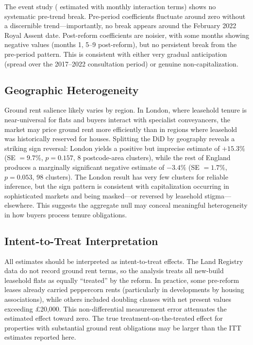 \documentclass[12pt]{article}
\begin{document}


The event study ( estimated with monthly interaction terms) shows no systematic pre-trend break. Pre-period coefficients fluctuate around zero without a discernible trend---importantly, no break appears around the February 2022 Royal Assent date. Post-reform coefficients are noisier, with some months showing negative values (months 1, 5--9 post-reform), but no persistent break from the pre-period pattern. This is consistent with either very gradual anticipation (spread over the 2017--2022 consultation period) or genuine non-capitalization.

\subsection{Geographic Heterogeneity}

Ground rent salience likely varies by region. In London, where leasehold tenure is near-universal for flats and buyers interact with specialist conveyancers, the market may price ground rent more efficiently than in regions where leasehold was historically reserved for houses. Splitting the DiD by geography reveals a striking sign reversal: London yields a positive but imprecise estimate of $+15.3\%$ (SE $= 9.7\%$, $p = 0.157$, 8 postcode-area clusters), while the rest of England produces a marginally significant negative estimate of $-3.4\%$ (SE $= 1.7\%$, $p = 0.053$, 98 clusters). The London result has very few clusters for reliable inference, but the sign pattern is consistent with capitalization occurring in sophisticated markets and being masked---or reversed by leasehold stigma---elsewhere. This suggests the aggregate null may conceal meaningful heterogeneity in how buyers process tenure obligations.

\subsection{Intent-to-Treat Interpretation}

All estimates should be interpreted as intent-to-treat effects. The Land Registry data do not record ground rent terms, so the analysis treats all new-build leasehold flats as equally ``treated'' by the reform. In practice, some pre-reform leases already carried peppercorn rents (particularly in developments by housing associations), while others included doubling clauses with net present values exceeding \pounds 20,000. This non-differential measurement error attenuates the estimated effect toward zero. The true treatment-on-the-treated effect for properties with substantial ground rent obligations may be larger than the ITT estimates reported here.
\end{document}

